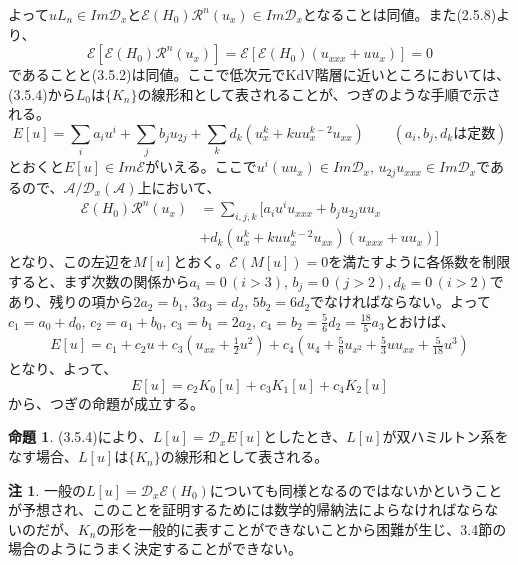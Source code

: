 \documentclass[a4paper, 11pt]{report}
\theoremstyle{definition}
\newtheorem{proposition}{命題}[section]
\newtheorem*{remark*}{注}
\begin{document}
 よって$uL_n\in Im\mathcal{D}_x$と$\mathcal{E}(H_0)\mathcal{R}^n(u_x)\in Im\mathcal{D}_x$となることは同値。また(2.5.8)より、
\begin{equation}
\mathcal{E}[\mathcal{E}(H_0)\mathcal{R}^n(u_x)] = \mathcal{E}[\mathcal{E}(H_0)(u_{xxx}+uu_x)] = 0  %
\end{equation}
であることと(3.5.2)は同値。ここで低次元でKdV階層に近いところにおいては、(3.5.4)から$L_0$は$\{ K_n \}$の線形和として表されることが、つぎのような手順で示される。
\begin{equation}
E[u] = \sum_ia_iu^i + \sum_jb_ju_{2j} + \sum_kd_k(u_x^k+kuu_x^{k-2}u_{xx}) \qquad (a_i,b_j,d_k\text{は定数})
\end{equation}
とおくと$E[u]\in Im\mathcal{E}$がいえる。ここで$u^i(uu_x)\in Im\mathcal{D}_x, \, u_{2j}u_{xxx}\in Im\mathcal{D}_x$であるので、$\mathcal{A} / \mathcal{D}_x(\mathcal{A})$上において、
\begin{align*}
\mathcal{E}(H_0)\mathcal{R}^n(u_x) &= \sum_{i,j,k}[a_iu^iu_{xxx} + b_ju_{2j}uu_x\\
&+ d_k(u_x^k+kuu_x^{k-2}u_{xx})(u_{xxx}+uu_x)]
\end{align*}
となり、この左辺を$M[u]$とおく。$\mathcal{E}(M[u])=0$を満たすように各係数を制限すると、まず次数の関係から$a_i=0\, (i>3), \, b_j=0\, (j>2), d_k=0\, (i>2)$であり、残りの項から$2a_2=b_1, \, 3a_3=d_2, \, 5b_2=6d_2$でなければならない。よって$c_1=a_0+d_0, \, c_2=a_1+b_0, \, c_3=b_1=2a_2, \, c_4=b_2=\frac{5}{6}d_2=\frac{18}{5}a_3$とおけば、
\begin{align*}
E[u] = c_1+c_2u+c_3(u_{xx}+\frac{1}{2}u^2)+c_4(u_4+\frac{5}{6}u_{x^2}+\frac{5}{3}uu_{xx}+\frac{5}{18}u^3)
\end{align*}
となり、よって、
\begin{equation*}
E[u] = c_2K_0[u]+c_3K_1[u]+c_4K_2[u]
\end{equation*}
から、つぎの命題が成立する。

\begin{proposition}
 (3.5.4)により、$L[u]=\mathcal{D}_xE[u]$としたとき、$L[u]$が双ハミルトン系をなす場合、$L[u]$は$\{ K_n \}$の線形和として表される。
\end{proposition}

\begin{remark*}
 一般の$L[u]=\mathcal{D}_x\mathcal{E}(H_0)$についても同様となるのではないかということが予想され、このことを証明するためには数学的帰納法によらなければならないのだが、$K_n$の形を一般的に表すことができないことから困難が生じ、3.4節の場合のようにうまく決定することができない。
\end{remark*}
\end{document}
